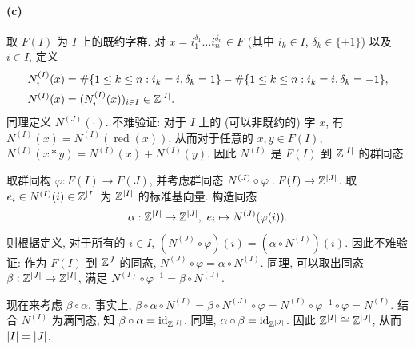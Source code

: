 \documentclass{article}
\begin{document}
\begin{solution}
	\paragraph{(c)} 取 $F(I)$ 为 $I$ 上的既约字群. 对 $x = i_1^{\delta_1} \dots i_n ^{\delta_n} \in F$ (其中 $i_k \in I$, $\delta_k \in \{\pm 1\}$) 以及 $i \in I$, 定义
	\begin{align*}
		N_i^{(I)}(x) &= \#\{1\le k\le n: i_k = i, \delta_k = 1\} - \#\{1 \le k\le n: i_k = i, \delta_k = -1\}, \\
		N^{(I)}(x) &= (N_i^{(I)}(x))_{i \in I} \in \mathbb{Z}^{\left|I\right|}. 
	\end{align*}
	同理定义 $N^{(J)}(\cdot)$. 不难验证: 对于 $I$ 上的 (可以非既约的) 字 $x$, 有 $N^{(I)}(x) = N^{(I)}(\operatorname{red}(x))$, 从而对于任意的 $x,y \in F(I)$, $N^{(I)}(x*y) = N^{(I)}(x) + N^{(I)}(y)$. 因此 $N^{(I)}$ 是 $F(I)$ 到 $\mathbb{Z}^{\left|I\right|}$ 的群同态.

	取群同构 $\varphi: F(I) \to F(J)$, 并考虑群同态 $N^{(J)} \circ \varphi: F(I) \to \mathbb{Z}^{\left|J\right|}$. 取 $e_i \in N^{(I)}(i) \in \mathbb{Z}^{\left|I\right|}	$ 为 $\mathbb{Z}^{\left|I\right|}$ 的标准基向量. 构造同态 
	\[ \alpha: \Z^{\abs{I}} \to \Z^{\abs{J}},\ 
	e_i \mapsto N^{(J)}(\varphi(i)). \]
	则根据定义, 对于所有的 $i \in I$, $(N^{(J)} \circ \varphi)(i) = (\alpha \circ N^{(I)})(i) $. 因此不难验证: 作为 $F(I)$ 到 $\mathbb{Z}^{J}$ 的同态, $N^{(J)} \circ \varphi = \alpha \circ N^{(I)}$. 同理, 可以取出同态 $\beta: \mathbb{Z}^{\left|J\right|} \to \mathbb{Z}^{\left|I\right|}$, 满足 $N^{(I)} \circ \varphi^{-1} = \beta \circ N^{(J)}$. 

	现在来考虑 $\beta \circ \alpha$. 事实上, $\beta \circ \alpha \circ N^{(I)} = \beta \circ N^{(J)} \circ \varphi = N^{(I)} \circ \varphi^{-1} \circ \varphi = N^{(I)}$. 结合 $N^{(I)}$ 为满同态, 知 $\beta \circ \alpha = \operatorname{id}_{\mathbb{Z}^{\left|I\right|}}$. 同理, $\alpha \circ \beta = \operatorname{id}_{\mathbb{Z}^{\left|J\right|}}$. 因此 $\mathbb{Z}^{\left|I\right|} \cong \mathbb{Z}^{\left|J\right|}$, 从而 $\left|I\right| = \left|J\right|$.
\end{solution}
\end{document}
